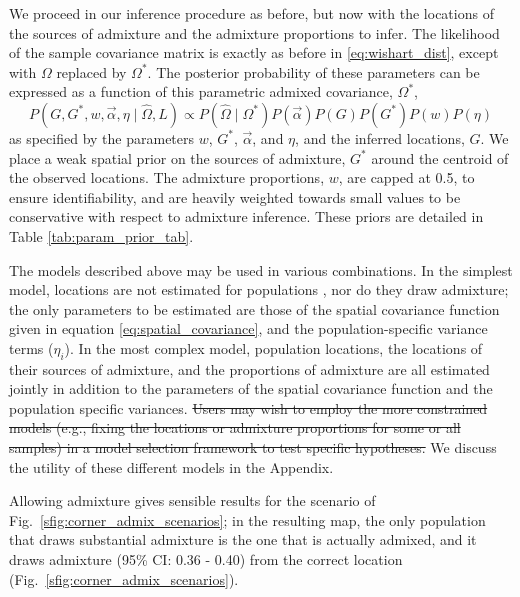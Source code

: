 \documentclass[10pt,letterpaper]{article}
\newcommand{\identifyadmixsource}[1]{{#1^{*}}}
\providecommand{\DIFdel}[1]{{\protect\color{red}\sout{#1}}}                      %
\providecommand{\DIFdelbegin}{} %
\providecommand{\DIFdelend}{} %
\begin{document}
We proceed in our inference procedure as before, but now with the locations of the sources of admixture and the admixture proportions to infer.
The likelihood of the sample covariance matrix is exactly as before in \eqref{eq:wishart_dist},
except with $\Omega$ replaced by $\identifyadmixsource{\Omega}$.
The posterior probability of these parameters can be expressed as a function of this parametric admixed covariance, $\identifyadmixsource{\Omega}$,
\begin{equation}
\label{eq:admixed_post_prob}
P(G,\identifyadmixsource{G}, w,\vec{\alpha}, \eta \mid \widehat{\Omega}, L) 
	\propto  
		P(\widehat{\Omega}  \mid \identifyadmixsource{\Omega}) P(\vec{\alpha}) P(G) P(\identifyadmixsource{G}) P(w) P(\eta) 
\end{equation}
as specified by the parameters $w$, $\identifyadmixsource{G}$, $\vec{\alpha}$, and $\eta$, and the inferred locations, $G$.  
We place a weak spatial prior on the sources of admixture, $\identifyadmixsource{G}$ around the centroid of the observed locations. The admixture proportions, $w$, are capped at 0.5, to ensure identifiability,
and are heavily weighted towards small values to be conservative with respect to admixture inference.  
These priors are detailed in Table \ref{tab:param_prior_tab}.

The models described above may be used in various combinations.  In the simplest model, locations are not estimated for populations , nor do they draw admixture; the only parameters to be estimated are those of the spatial covariance function given in equation \eqref{eq:spatial_covariance}, and the population-specific variance terms ($\eta_i$).  In the most complex model, population locations, the locations of their sources of admixture, and the proportions of admixture are all estimated jointly in addition to the parameters of the spatial covariance function and the population specific variances.  \DIFdelbegin \DIFdel{Users may wish to employ the more constrained models (e.g., fixing the locations or admixture proportions for some or all samples) in a model selection framework to test specific hypotheses.  }\DIFdelend We discuss the utility of these different models in the Appendix.

Allowing admixture gives sensible results for the scenario of Fig.\ \ref{sfig:corner_admix_scenarios};
in the resulting map,
the only population that draws substantial admixture is the one that is actually admixed, 
and it draws admixture (95\% CI: 0.36 - 0.40) from the correct location (Fig.\ \ref{sfig:corner_admix_scenarios}).
\end{document}
